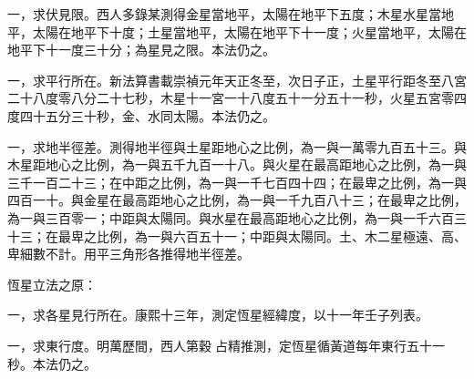 \begin{pinyinscope}
一，求伏見限。西人多錄某測得金星當地平，太陽在地平下五度；木星水星當地平，太陽在地平下十度；土星當地平，太陽在地平下十一度；火星當地平，太陽在地平下十一度三十分；為星見之限。本法仍之。

一，求平行所在。新法算書載崇禎元年天正冬至，次日子正，土星平行距冬至八宮二十八度零八分二十七秒，木星十一宮一十八度五十一分五十一秒，火星五宮零四度四十五分三十秒，金、水同太陽。本法仍之。

一，求地半徑差。測得地半徑與土星距地心之比例，為一與一萬零九百五十三。與木星距地心之比例，為一與五千九百一十八。與火星在最高距地心之比例，為一與三千一百二十三；在中距之比例，為一與一千七百四十四；在最卑之比例，為一與四百一十。與金星在最高距地心之比例，為一與一千九百八十三；在最卑之比例，為一與三百零一；中距與太陽同。與水星在最高距地心之比例，為一與一千六百三十三；在最卑之比例，為一與六百五十一；中距與太陽同。土、木二星極遠、高、卑細數不計。用平三角形各推得地半徑差。

恆星立法之原：

一，求各星見行所在。康熙十三年，測定恆星經緯度，以十一年壬子列表。

一，求東行度。明萬歷間，西人第穀占精推測，定恆星循黃道每年東行五十一秒。本法仍之。


\end{pinyinscope}
